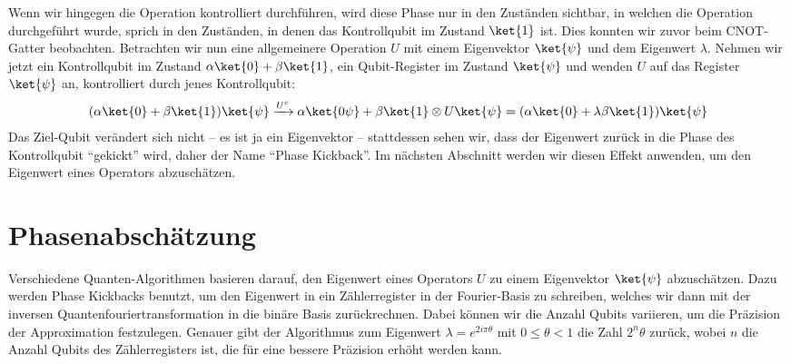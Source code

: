 Wenn wir hingegen die Operation kontrolliert durchführen, wird diese Phase nur in den Zuständen sichtbar, in welchen die Operation durchgeführt wurde, sprich in den Zuständen, in denen das Kontrollqubit im Zustand $\ket{1}$ ist. Dies konnten wir zuvor beim CNOT-Gatter beobachten. Betrachten wir nun eine allgemeinere Operation $U$ mit einem Eigenvektor $\ket{\psi}$ und dem Eigenwert $\lambda$. Nehmen wir jetzt ein Kontrollqubit im Zustand $\alpha\ket{0} + \beta\ket{1}$, ein Qubit-Register im Zustand $\ket{\psi}$ und wenden $U$ auf das Register $\ket{\psi}$ an, kontrolliert durch jenes Kontrollqubit:
\begin{align*}
(\alpha\ket{0} + \beta\ket{1})\ket{\psi} \xrightarrow{U^c} \alpha\ket{0\psi} + \beta\ket{1}\otimes U\ket{\psi} = (\alpha\ket{0} + \lambda\beta\ket{1})\ket{\psi}
\end{align*}
Das Ziel-Qubit verändert sich nicht – es ist ja ein Eigenvektor – stattdessen sehen wir, dass der Eigenwert zurück in die Phase des Kontrollqubit "`gekickt"' wird, daher der Name "`Phase Kickback"'. Im nächsten Abschnitt werden wir diesen Effekt anwenden, um den Eigenwert eines Operators abzuschätzen.

\section{Phasenabschätzung}
Verschiedene Quanten-Algorithmen basieren darauf, den Eigenwert eines Operators $U$ zu einem Eigenvektor $\ket{\psi}$ abzuschätzen. Dazu werden Phase Kickbacks benutzt, um den Eigenwert in ein Zählerregister in der Fourier-Basis zu schreiben, welches wir dann mit der inversen Quantenfouriertransformation in die binäre Basis zurückrechnen. Dabei können wir die Anzahl Qubits variieren, um die Präzision der Approximation festzulegen. Genauer gibt der Algorithmus zum Eigenwert $\lambda = e^{2i\pi\theta}$ mit $0 \leq \theta < 1$ die Zahl $2^n\theta$ zurück, wobei $n$ die Anzahl Qubits des Zählerregisters ist, die für eine bessere Präzision erhöht werden kann. 
